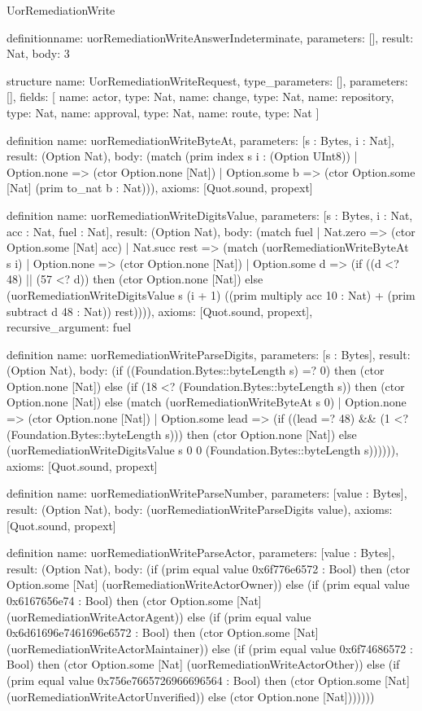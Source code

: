 \begin{lexlean}{UorRemediationWrite}
\begin{semanticmodule}
definition{name: uorRemediationWriteAnswerIndeterminate, parameters: [], result: Nat, body: 3}

structure{
  name: UorRemediationWriteRequest,
  type_parameters: [],
  parameters: [],
  fields: [
    {name: actor, type: Nat},
    {name: change, type: Nat},
    {name: repository, type: Nat},
    {name: approval, type: Nat},
    {name: route, type: Nat}
  ]
}

definition{
  name: uorRemediationWriteByteAt,
  parameters: [s : Bytes, i : Nat],
  result: (Option Nat),
  body: (match (prim index s i : (Option UInt8))
    | Option.none => (ctor Option.none [Nat])
    | Option.some b => (ctor Option.some [Nat] (prim to_nat b : Nat))),
  axioms: [Quot.sound, propext]
}

definition{
  name: uorRemediationWriteDigitsValue,
  parameters: [s : Bytes, i : Nat, acc : Nat, fuel : Nat],
  result: (Option Nat),
  body: (match fuel
    | Nat.zero => (ctor Option.some [Nat] acc)
    | Nat.succ rest => (match (uorRemediationWriteByteAt s i)
      | Option.none => (ctor Option.none [Nat])
      | Option.some d => (if ((d <? 48) || (57 <? d)) then (ctor Option.none [Nat]) else (uorRemediationWriteDigitsValue s (i + 1) ((prim multiply acc 10 : Nat) + (prim subtract d 48 : Nat)) rest)))),
  axioms: [Quot.sound, propext],
  recursive_argument: fuel
}

definition{
  name: uorRemediationWriteParseDigits,
  parameters: [s : Bytes],
  result: (Option Nat),
  body: (if ((Foundation.Bytes::byteLength s) =? 0) then (ctor Option.none [Nat]) else (if (18 <? (Foundation.Bytes::byteLength s)) then (ctor Option.none [Nat]) else (match (uorRemediationWriteByteAt s 0)
    | Option.none => (ctor Option.none [Nat])
    | Option.some lead => (if ((lead =? 48) && (1 <? (Foundation.Bytes::byteLength s))) then (ctor Option.none [Nat]) else (uorRemediationWriteDigitsValue s 0 0 (Foundation.Bytes::byteLength s)))))),
  axioms: [Quot.sound, propext]
}

definition{
  name: uorRemediationWriteParseNumber,
  parameters: [value : Bytes],
  result: (Option Nat),
  body: (uorRemediationWriteParseDigits value),
  axioms: [Quot.sound, propext]
}

definition{
  name: uorRemediationWriteParseActor,
  parameters: [value : Bytes],
  result: (Option Nat),
  body: (if (prim equal value 0x6f776e6572 : Bool) then (ctor Option.some [Nat] (uorRemediationWriteActorOwner)) else (if (prim equal value 0x6167656e74 : Bool) then (ctor Option.some [Nat] (uorRemediationWriteActorAgent)) else (if (prim equal value 0x6d61696e7461696e6572 : Bool) then (ctor Option.some [Nat] (uorRemediationWriteActorMaintainer)) else (if (prim equal value 0x6f74686572 : Bool) then (ctor Option.some [Nat] (uorRemediationWriteActorOther)) else (if (prim equal value 0x756e7665726966696564 : Bool) then (ctor Option.some [Nat] (uorRemediationWriteActorUnverified)) else (ctor Option.none [Nat]))))))
}


\end{semanticmodule}
\end{lexlean}

